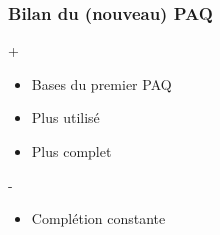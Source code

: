\begin{frame}
\frametitle{Bilan du (nouveau) PAQ}

\begin{block}{+}
\begin{itemize}
	\item Bases du premier PAQ %
	\item Plus utilisé %
	\item Plus complet %
\end{itemize}
\end{block} %

\begin{block}{-}
\begin{itemize}
	\item Complétion constante %
\end{itemize}
\end{block} %

\end{frame} %


